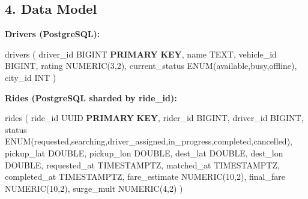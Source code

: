 \documentclass[11pt]{article}
\newenvironment{Shaded}{\begin{snugshade}}{\end{snugshade}}
\newcommand{\DataTypeTok}[1]{\textcolor[rgb]{0.16,0.50,0.73}{#1}}
\newcommand{\DecValTok}[1]{\textcolor[rgb]{0.96,0.45,0.00}{#1}}
\newcommand{\KeywordTok}[1]{\textcolor[rgb]{0.81,0.81,0.76}{\textbf{#1}}}
\newcommand{\NormalTok}[1]{\textcolor[rgb]{0.81,0.81,0.76}{#1}}
\newcommand{\StringTok}[1]{\textcolor[rgb]{0.96,0.31,0.31}{#1}}
\begin{document}
\subsection{4. Data Model}\label{4-data-model-1}

\textbf{Drivers (PostgreSQL):}


\begin{Shaded}
\begin{Highlighting}[]
\NormalTok{drivers (}
\NormalTok{  driver\_id       BIGINT }\KeywordTok{PRIMARY} \KeywordTok{KEY}\NormalTok{,}
\NormalTok{  name            TEXT,}
\NormalTok{  vehicle\_id      BIGINT,}
\NormalTok{  rating          }\DataTypeTok{NUMERIC}\NormalTok{(}\DecValTok{3}\NormalTok{,}\DecValTok{2}\NormalTok{),}
\NormalTok{  current\_status  ENUM(}\StringTok{\textquotesingle{}available\textquotesingle{}}\NormalTok{,}\StringTok{\textquotesingle{}busy\textquotesingle{}}\NormalTok{,}\StringTok{\textquotesingle{}offline\textquotesingle{}}\NormalTok{),}
\NormalTok{  city\_id         }\DataTypeTok{INT}
\NormalTok{)}
\end{Highlighting}
\end{Shaded}

\textbf{Rides (PostgreSQL sharded by ride\_id):}


\begin{Shaded}
\begin{Highlighting}[]
\NormalTok{rides (}
\NormalTok{  ride\_id         UUID }\KeywordTok{PRIMARY} \KeywordTok{KEY}\NormalTok{,}
\NormalTok{  rider\_id        BIGINT,}
\NormalTok{  driver\_id       BIGINT,}
\NormalTok{  status          ENUM(}\StringTok{\textquotesingle{}requested\textquotesingle{}}\NormalTok{,}\StringTok{\textquotesingle{}searching\textquotesingle{}}\NormalTok{,}\StringTok{\textquotesingle{}driver\_assigned\textquotesingle{}}\NormalTok{,}\StringTok{\textquotesingle{}in\_progress\textquotesingle{}}\NormalTok{,}\StringTok{\textquotesingle{}completed\textquotesingle{}}\NormalTok{,}\StringTok{\textquotesingle{}cancelled\textquotesingle{}}\NormalTok{),}
\NormalTok{  pickup\_lat      }\DataTypeTok{DOUBLE}\NormalTok{,}
\NormalTok{  pickup\_lon      }\DataTypeTok{DOUBLE}\NormalTok{,}
\NormalTok{  dest\_lat        }\DataTypeTok{DOUBLE}\NormalTok{,}
\NormalTok{  dest\_lon        }\DataTypeTok{DOUBLE}\NormalTok{,}
\NormalTok{  requested\_at    TIMESTAMPTZ,}
\NormalTok{  matched\_at      TIMESTAMPTZ,}
\NormalTok{  completed\_at    TIMESTAMPTZ,}
\NormalTok{  fare\_estimate   }\DataTypeTok{NUMERIC}\NormalTok{(}\DecValTok{10}\NormalTok{,}\DecValTok{2}\NormalTok{),}
\NormalTok{  final\_fare      }\DataTypeTok{NUMERIC}\NormalTok{(}\DecValTok{10}\NormalTok{,}\DecValTok{2}\NormalTok{),}
\NormalTok{  surge\_mult      }\DataTypeTok{NUMERIC}\NormalTok{(}\DecValTok{4}\NormalTok{,}\DecValTok{2}\NormalTok{)}
\NormalTok{)}
\end{Highlighting}
\end{Shaded}
\end{document}
